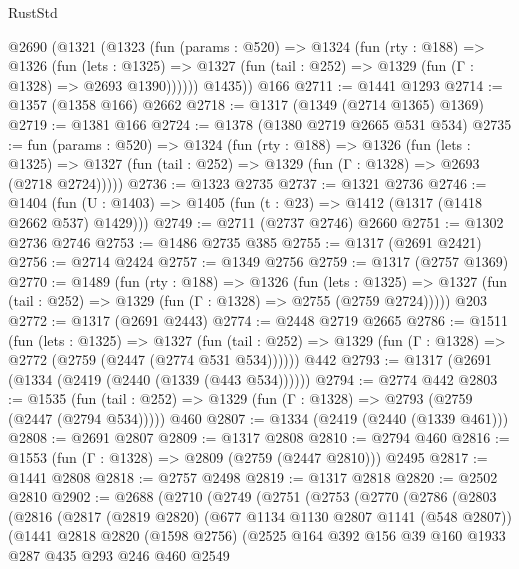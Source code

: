 \begin{lexlean}{RustStd}
\begin{coremodule}
    @2690
      (@1321
        (@1323
          (fun (params : @520) =>
          @1324
            (fun (rty : @188) =>
            @1326
              (fun (lets : @1325) =>
              @1327 (fun (tail : @252) => @1329 (fun (Γ : @1328) => @2693 @1390))))))
        @1435))
    @166
@2711 := @1441 @1293
@2714 := @1357 (@1358 @166) @2662
@2718 := @1317 (@1349 (@2714 @1365) @1369)
@2719 := @1381 @166
@2724 := @1378 (@1380 @2719 @2665 @531 @534)
@2735 := fun (params : @520) =>
  @1324
    (fun (rty : @188) =>
    @1326
      (fun (lets : @1325) =>
      @1327 (fun (tail : @252) => @1329 (fun (Γ : @1328) => @2693 (@2718 @2724)))))
@2736 := @1323 @2735
@2737 := @1321 @2736
@2746 := @1404 (fun (U : @1403) => @1405 (fun (t : @23) => @1412 (@1317 (@1418 @2662 @537) @1429)))
@2749 := @2711 (@2737 @2746) @2660
@2751 := @1302 @2736 @2746
@2753 := @1486 @2735 @385
@2755 := @1317 (@2691 @2421)
@2756 := @2714 @2424
@2757 := @1349 @2756
@2759 := @1317 (@2757 @1369)
@2770 := @1489
    (fun (rty : @188) =>
    @1326
      (fun (lets : @1325) =>
      @1327 (fun (tail : @252) => @1329 (fun (Γ : @1328) => @2755 (@2759 @2724)))))
    @203
@2772 := @1317 (@2691 @2443)
@2774 := @2448 @2719 @2665
@2786 := @1511
    (fun (lets : @1325) =>
    @1327 (fun (tail : @252) => @1329 (fun (Γ : @1328) => @2772 (@2759 (@2447 (@2774 @531 @534))))))
    @442
@2793 := @1317 (@2691 (@1334 (@2419 (@2440 (@1339 (@443 @534))))))
@2794 := @2774 @442
@2803 := @1535
    (fun (tail : @252) => @1329 (fun (Γ : @1328) => @2793 (@2759 (@2447 (@2794 @534)))))
    @460
@2807 := @1334 (@2419 (@2440 (@1339 @461)))
@2808 := @2691 @2807
@2809 := @1317 @2808
@2810 := @2794 @460
@2816 := @1553 (fun (Γ : @1328) => @2809 (@2759 (@2447 @2810))) @2495
@2817 := @1441 @2808
@2818 := @2757 @2498
@2819 := @1317 @2818
@2820 := @2502 @2810
@2902 := @2688
    (@2710
      (@2749
        (@2751
          (@2753
            (@2770
              (@2786
                (@2803
                  (@2816
                    (@2817
                      (@2819 @2820)
                      (@677 @1134 @1130 @2807 @1141 (@548 @2807))
                      (@1441
                        @2818
                        @2820
                        (@1598 @2756)
                        (@2525
                          @164
                          @392
                          @156
                          @39
                          @160
                          @1933
                          @287
                          @435
                          @293
                          @246
                          @460
                          @2549

\end{coremodule}
\end{lexlean}
